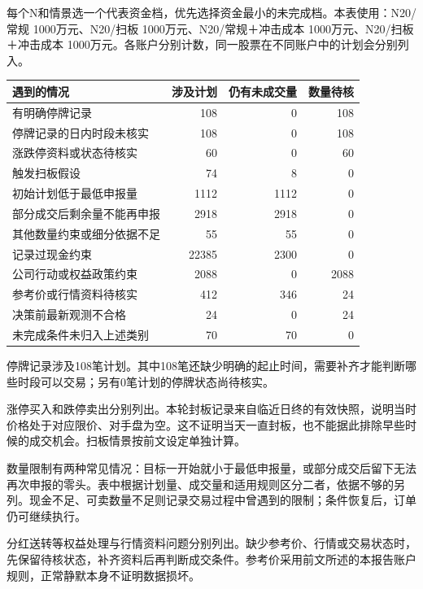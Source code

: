 \documentclass[UTF8,10pt,a4paper,fontset=fandol]{ctexart}
\begin{document}
每个N和情景选一个代表资金档，优先选择资金最小的未完成档。本表使用：N20/常规 1000万元、N20/扫板 1000万元、N20/常规＋冲击成本 1000万元、N20/扫板＋冲击成本 1000万元。各账户分别计数，同一股票在不同账户中的计划会分别列入。\begin{table}[H]\centering\small\begin{tabular}{lrrr}\toprule 遇到的情况 & 涉及计划 & 仍有未成交量 & 数量待核\\\midrule 有明确停牌记录 & 108 & 0 & 108 \\
停牌记录的日内时段未核实 & 108 & 0 & 108 \\
涨跌停资料或状态待核实 & 60 & 0 & 60 \\
触发扫板假设 & 74 & 8 & 0 \\
初始计划低于最低申报量 & 1112 & 1112 & 0 \\
部分成交后剩余量不能再申报 & 2918 & 2918 & 0 \\
其他数量约束或细分依据不足 & 55 & 55 & 0 \\
记录过现金约束 & 22385 & 2300 & 0 \\
公司行动或权益政策约束 & 2088 & 0 & 2088 \\
参考价或行情资料待核实 & 412 & 346 & 24 \\
决策前最新观测不合格 & 24 & 0 & 24 \\
未完成条件未归入上述类别 & 70 & 70 & 0 \\\bottomrule\end{tabular}\end{table}

停牌记录涉及108笔计划。其中108笔还缺少明确的起止时间，需要补齐才能判断哪些时段可以交易；另有0笔计划的停牌状态尚待核实。

涨停买入和跌停卖出分别列出。本轮封板记录来自临近日终的有效快照，说明当时价格处于对应限价、对手盘为空。这不证明当天一直封板，也不能据此排除早些时候的成交机会。扫板情景按前文设定单独计算。

数量限制有两种常见情况：目标一开始就小于最低申报量，或部分成交后留下无法再次申报的零头。表中根据计划量、成交量和适用规则区分二者，依据不够的另列。现金不足、可卖数量不足则记录交易过程中曾遇到的限制；条件恢复后，订单仍可继续执行。

分红送转等权益处理与行情资料问题分别列出。缺少参考价、行情或交易状态时，先保留待核状态，补齐资料后再判断成交条件。参考价采用前文所述的本报告账户规则，正常静默本身不证明数据损坏。
\end{document}

